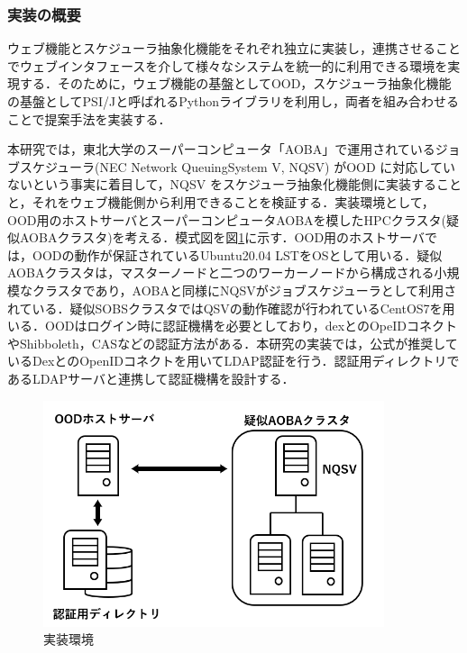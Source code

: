\subsubsection{実装の概要}
ウェブ機能とスケジューラ抽象化機能をそれぞれ独立に実装し，連携させることでウェブインタフェースを介して様々なシステムを統一的に利用できる環境を実現する．そのために，ウェブ機能の基盤としてOOD，スケジューラ抽象化機能の基盤としてPSI/J\cite{cite5}と呼ばれるPythonライブラリを利用し，両者を組み合わせることで提案手法を実装する．\par
本研究では，東北大学のスーパーコンピュータ「AOBA」で運用されているジョブスケジューラ(NEC Network QueuingSystem V, NQSV) がOOD に対応していないという事実に着目して，NQSV をスケジューラ抽象化機能側に実装することと，それをウェブ機能側から利用できることを検証する．実装環境として，OOD用のホストサーバとスーパーコンピュータAOBAを模したHPCクラスタ(疑似AOBAクラスタ)を考える．模式図を図\ref{fig7}に示す．OOD用のホストサーバでは，OODの動作が保証されているUbuntu20.04 LSTをOSとして用いる．疑似AOBAクラスタは，マスターノードと二つのワーカーノードから構成される小規模なクラスタであり，AOBAと同様にNQSVがジョブスケジューラとして利用されている．疑似SOBSクラスタではQSVの動作確認が行われているCentOS7を用いる．OODはログイン時に認証機構を必要としており，dexとのOpeIDコネクトやShibboleth，CASなどの認証方法がある．本研究の実装では，公式が推奨しているDexとのOpenIDコネクトを用いてLDAP認証を行う．認証用ディレクトリであるLDAPサーバと連携して認証機構を設計する．\par

\begin{figure}[tb]
    \centering
    \includegraphics[width=100mm]{./fig/environment.png}
    \caption{実装環境}
    \label{fig7}
\end{figure}


